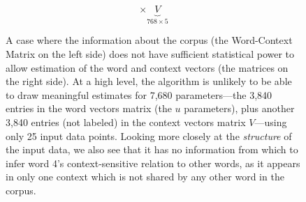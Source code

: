 \begin{figure}[ht!]
\[	%
	\times \underbrace{V}_{768 \times 5}
	\]
	\caption{A case where the information about the corpus (the Word-Context Matrix on the left side) does not have sufficient statistical power to allow estimation of the word and context vectors (the matrices on the right side). At a high level, the algorithm is unlikely to be able to draw meaningful estimates for 7,680 parameters---the 3,840 entries in the word vectors matrix (the $u$ parameters), plus another 3,840 entries (not labeled) in the context vectors matrix $V$---using only 25 input data points. Looking more closely at the \textit{structure} of the input data, we also see that it has no information from which to infer word 4's context-sensitive relation to other words, as it appears in only one context which is not shared by any other word in the corpus.}
	\label{fig:decomposition-bad}
\end{figure}